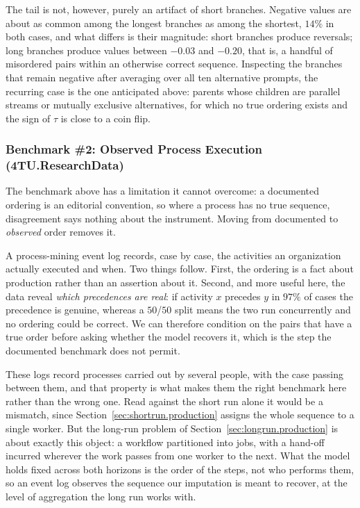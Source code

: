 The tail is not, however, purely an artifact of short branches.
Negative values are about as common among the longest branches as among the shortest, $14\%$ in both cases, and what differs is their magnitude: short branches produce reversals; long branches produce values between $-0.03$ and $-0.20$, that is, a handful of misordered pairs within an otherwise correct sequence.
Inspecting the branches that remain negative after averaging over all ten alternative prompts, the recurring case is the one anticipated above: parents whose children are parallel streams or mutually exclusive alternatives, for which no true ordering exists and the sign of $\tau$ is close to a coin flip.

\subsubsection{Benchmark \#2: Observed Process Execution (4TU.ResearchData)}
\label{app:eventlog_validation}

The benchmark above has a limitation it cannot overcome: a documented ordering is an editorial convention, so where a process has no true sequence, disagreement says nothing about the instrument.
Moving from documented to \emph{observed} order removes it.

A process-mining event log records, case by case, the activities an organization actually executed and when.
Two things follow.
First, the ordering is a fact about production rather than an assertion about it.
Second, and more useful here, the data reveal \emph{which precedences are real}: if activity $x$ precedes $y$ in $97\%$ of cases the precedence is genuine, whereas a $50$/$50$ split means the two run concurrently and no ordering could be correct.
We can therefore condition on the pairs that have a true order before asking whether the model recovers it, which is the step the documented benchmark does not permit.

These logs record processes carried out by several people, with the case passing between them, and that property is what makes them the right benchmark here rather than the wrong one.
Read against the short run alone it would be a mismatch, since Section~\ref{sec:shortrun.production} assigns the whole sequence to a single worker.
But the long-run problem of Section~\ref{sec:longrun.production} is about exactly this object: a workflow partitioned into jobs, with a hand-off incurred wherever the work passes from one worker to the next.
What the model holds fixed across both horizons is the order of the steps, not who performs them, so an event log observes the sequence our imputation is meant to recover, at the level of aggregation the long run works with.

